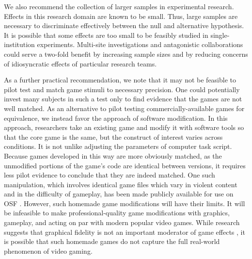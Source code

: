 \documentclass[fignum,nobf,man]{apa}
\begin{document}
We also recommend the collection of larger samples in experimental research. Effects in this research domain are known to be small. Thus, large samples are necessary to discriminate effectively between the null and alternative hypothesis. It is possible that some effects are too small to be feasibly studied in single-institution experiments. Multi-site investigations and antagonistic collaborations could serve a two-fold benefit by increasing sample sizes and by reducing concerns of idiosyncratic effects of particular research teams.

As a further practical recommendation, we note that it may not be feasible to pilot test and match game stimuli to necessary precision. One could potentially invest many subjects in such a test only to find evidence that the games are not well matched. As an alternative to pilot testing commercially-available games for equivalence, we instead favor the approach of software modification. In this approach, researchers take an existing game and modify it with software tools so that the core game is the same, but the construct of interest varies across conditions. It is not unlike adjusting the parameters of computer task script. Because games developed in this way are more obviously matched, as the unmodified portions of the game's code are identical between versions, it requires less pilot evidence to conclude that they are indeed matched. One such manipulation, which involves identical game files which vary in violent content and in the difficulty of gameplay, has been made publicly available for use on OSF \citep{Hilgard:2014}. However, such homemade game modifications will have their limits. It will be infeasible to make professional-quality game modifications with graphics, gameplay, and acting on par with modern popular video games. While research suggests that graphical fidelity is not an important moderator of game effects \citep{Ivory:Kalyaraman:2007}, it is possible that such homemade games do not capture the full real-world phenomenon of video gaming.
\end{document}
